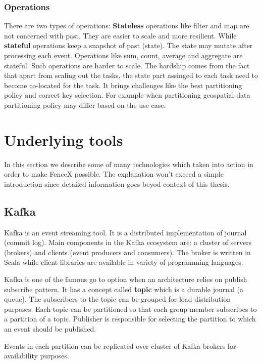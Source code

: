 \documentclass[a4]{report}
\begin{document}
    \subsubsection{Operations}
    There are two types of operations:
    \textbf{Stateless} operations like filter and map are not concerned with past.
    They are easier to scale and more resilient.
    While \textbf{stateful} operations keep a snapshot of past (state).
    The state may mutate after processing each event.
    Operations like sum, count, average and aggregate are stateful.
    Such operations are harder to scale.
    The hardship comes from the fact that apart from scaling out the tasks, the state part assinged to each task need
    to become co-located for the task.
    It brings challenges like the best partitioning policy and correct key selection.
    For example when partitioning geospatial data partitioning policy may differ based on the use case.

    \section{Underlying tools}
    In this section we describe some of many technologies which taken into action in order to make FenceX possible.
    The explanation won't exceed a simple introduction since detailed information goes beyod context of this thesis.

    \subsection{Kafka}
    Kafka\cite{kafka} is an event streaming tool.
    It is a distributed implementation of journal (commit log).
    Main components in the Kafka ecosystem are: a cluster of servers (brokers) and clients (event producers and consumers).
    The broker is written in Scala while client libraries are available in variety of programming languages.

    Kafka is one of the famous go to option when an architecture relies on publish subscribe pattern.
    It has a concept called \textbf{topic} which is a durable journal (a queue).
    The subscribers to the topic can be grouped for load distribution purposes.
    Each topic can be partitioned so that each group member subscribes to a partition of a topic.
    Publisher is responsible for selecting the partition to which an event should be published.

    Events in each partition can be replicated over cluster of Kafka brokers for availability purposes.
\end{document}
